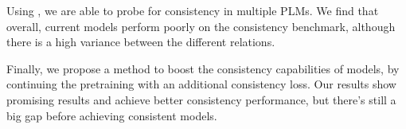Using \resource{}, we are able to probe for consistency in multiple PLMs.
We find that overall, current models perform poorly on the consistency benchmark, although there is a high variance between the different relations. 

Finally, we propose a method to boost the consistency capabilities of models, by continuing the pretraining with an additional consistency loss. Our results show promising results and achieve better consistency performance, but there's still a big gap before achieving consistent models.
